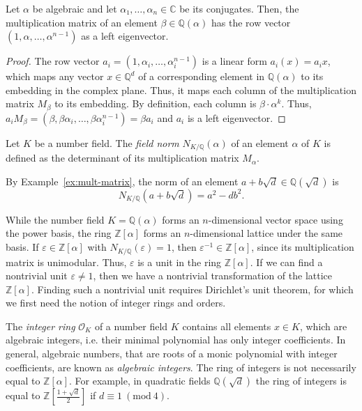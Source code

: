 \begin{lemma}
  \label{lem:mult-eig}
  Let $α$ be algebraic and let $α₁, …, α_n ∈ ℂ$ be its conjugates.
  Then, the multiplication matrix of an element $β ∈ ℚ(α)$ has the row vector
  $(1, α, …, α^{n-1})$ as a left eigenvector.
\end{lemma}

\begin{proof}
  The row vector $a_i = (1, α_i, …, α_i^{n-1})$ is a linear form $a_i(x) = a_i x$,
  which maps any vector $x ∈ ℚ^d$ of a corresponding element in $ℚ(α)$ to its
  embedding in the complex plane.
  Thus, it maps each column of the multiplication matrix $M_β$ to its embedding.
  By definition,
  each column is $β · α^k$.
  Thus, $a_i M_β = (β, β α_i, …, β α_i^{n-1}) = β a_i$ and $a_i$ is a left
  eigenvector.
\end{proof}

\begin{definition}
  Let $K$ be a number field.
  The \emph{field norm} $N_{K/ℚ}(α)$ of an element $α$ of $K$ is defined as the
  determinant of its multiplication matrix $M_α$.
\end{definition}

\begin{example}
  By Example~\ref{ex:mult-matrix},
  the norm of an element $a + b \sqrt{d} ∈ ℚ(\sqrt{d})$ is
  \[
    N_{K/ℚ}(a + b \sqrt{d}) = a^2 - d b^2.
  \]
\end{example}

While the number field $K = ℚ(α)$ forms an $n$-dimensional vector space using
the power basis, the ring $ℤ[α]$ forms an $n$-dimensional lattice under the same basis.
If $ε ∈ ℤ[α]$ with $N_{K/ℚ}(ε) = 1$, then $ε^{-1} ∈ ℤ[α]$,
since its multiplication matrix is unimodular.
Thus, $ε$ is a unit in the ring $ℤ[α]$.
If we can find a nontrivial unit $ε ≠ 1$,
then we have a nontrivial transformation of the lattice $ℤ[α]$.
Finding such a nontrivial unit requires Dirichlet's unit theorem,
for which we first need the notion of integer rings and orders.

The \emph{integer ring} $\mathcal O_K$ of a number field $K$
contains all elements $x ∈ K$, which are algebraic integers,
i.e. their minimal polynomial has only integer coefficients.
In general, algebraic numbers, that are roots of a monic polynomial with
integer coefficients, are known as \emph{algebraic integers}.
The ring of integers is not necessarily equal to $ℤ[α]$.
For example, in quadratic fields $ℚ(\sqrt{d})$
the ring of integers is equal to $ℤ\left[\frac{1+\sqrt{d}}{2}\right]$ if $d ≡ 1\ (\mathrm{mod}\ 4)$.

